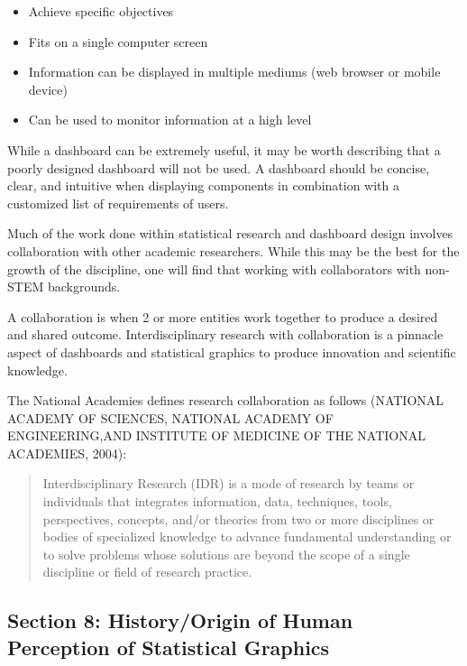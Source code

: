 \documentclass[print]{nuthesis}
\providecommand{\tightlist}{%
  \setlength{\itemsep}{0pt}\setlength{\parskip}{0pt}}
\begin{document}
\begin{itemize}
\tightlist
\item
  Achieve specific objectives
\item
  Fits on a single computer screen
\item
  Information can be displayed in multiple mediums (web browser or mobile device)
\item
  Can be used to monitor information at a high level
\end{itemize}

While a dashboard can be extremely useful, it may be worth describing that a poorly designed dashboard will not be used. A dashboard should be concise, clear, and intuitive when displaying components in combination with a customized list of requirements of users.

Much of the work done within statistical research and dashboard design involves collaboration with other academic researchers. While this may be the best for the growth of the discipline, one will find that working with collaborators with non-STEM backgrounds.

A collaboration is when 2 or more entities work together to produce a desired and shared outcome. Interdisciplinary research with collaboration is a pinnacle aspect of dashboards and statistical graphics to produce innovation and scientific knowledge.

The National Academies defines research collaboration as follows (NATIONAL ACADEMY OF SCIENCES, NATIONAL ACADEMY OF ENGINEERING,AND INSTITUTE OF MEDICINE OF THE NATIONAL ACADEMIES, 2004):

\begin{quote}
Interdisciplinary Research (IDR) is a mode of research by teams or individuals that integrates information, data, techniques, tools, perspectives, concepts, and/or theories from two or more disciplines or bodies of specialized knowledge to advance fundamental understanding or to solve problems whose solutions are beyond the scope of a single discipline or field of research practice.
\end{quote}

\hypertarget{section-8-historyorigin-of-human-perception-of-statistical-graphics}{%
\subsection{Section 8: History/Origin of Human Perception of Statistical Graphics}\label{section-8-historyorigin-of-human-perception-of-statistical-graphics}}
\end{document}
